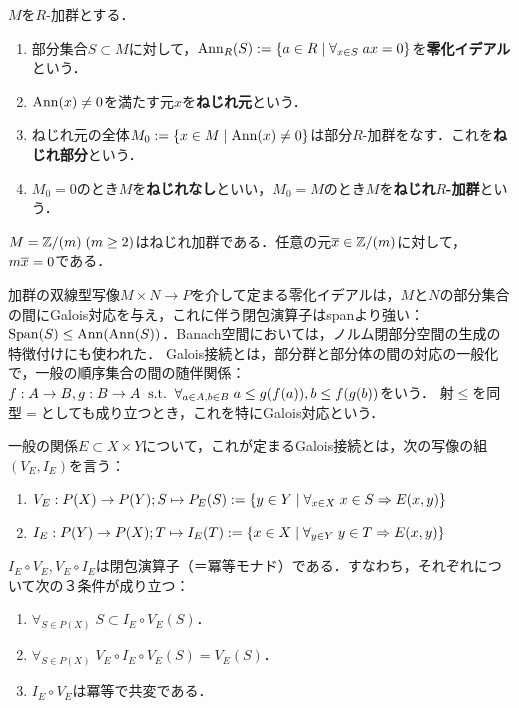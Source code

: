 \documentclass[uplatex,dvipdfmx]{jsreport}
\begin{document}
\begin{definition}
    $M$を$R$-加群とする．
    \begin{enumerate}
        \item 部分集合$S\subset M$に対して，$\mathrm{Ann}_R(S):=\left\{a\in R\mid\forall_{x\in S}\;ax=0\right\}$を\textbf{零化イデアル}という．
        \item $\mathrm{Ann}(x)\ne0$を満たす元$x$を\textbf{ねじれ元}という．
        \item ねじれ元の全体$M_0:=\left\{x\in M\mid\mathrm{Ann}(x)\ne0\right\}$は部分$R$-加群をなす．これを\textbf{ねじれ部分}という．
        \item $M_0=0$のとき$M$を\textbf{ねじれなし}といい，$M_0=M$のとき$M$を\textbf{ねじれ$R$-加群}という．
    \end{enumerate}
\end{definition}
\begin{example}
    $M=\mathbb{Z}/(m)\;(m\ge 2)$はねじれ加群である．任意の元$\overline{x}\in\mathbb{Z}/(m)$に対して，$m\overline{x}=0$である．
\end{example}

\begin{discussion}
    加群の双線型写像$M\times N\to P$を介して定まる零化イデアルは，$M$と$N$の部分集合の間にGalois対応を与え，これに伴う閉包演算子はspanより強い：$\mathrm{Span}(S)\le\mathrm{Ann}(\mathrm{Ann}(S))$．Banach空間においては，ノルム閉部分空間の生成の特徴付けにも使われた．
    Galois接続とは，部分群と部分体の間の対応の一般化で，一般の順序集合の間の随伴関係：$f:A\to B,g:B\to A\;\;\mathrm{s.t.}\;\;\forall_{a\in A,b\in B}\;a\le g(f(a)),b\le f(g(b))$をいう．
    射$\le$を同型$=$としても成り立つとき，これを特にGalois対応という．
\end{discussion}

\begin{definition}
    一般の関係$E\subset X\times Y$について，これが定まるGalois接続とは，次の写像の組$(V_E,I_E)$を言う：
    \begin{enumerate}
        \item $V_E:P(X)\to P(Y);S\mapsto P_E(S):=\left\{y\in Y\mid\forall_{x\in X}\;x\in S\Rightarrow E(x,y)\right\}$
        \item $I_E:P(Y)\to P(X);T\mapsto I_E(T):=\left\{x\in X\mid\forall_{y\in Y}\;y\in T\Rightarrow E(x,y)\right\}$
    \end{enumerate}
\end{definition}

\begin{proposition}
    $I_E\circ V_E,V_E\circ I_E$は閉包演算子（＝冪等モナド）である．すなわち，それぞれについて次の３条件が成り立つ：
    \begin{enumerate}
        \item $\forall_{S\in P(X)}\;S\subset I_E\circ V_E(S)$．
        \item $\forall_{S\in P(X)}\;V_E\circ I_E\circ V_E(S)=V_E(S)$．
        \item $I_E\circ V_E$は冪等で共変である．
    \end{enumerate}
\end{proposition}
\end{document}
